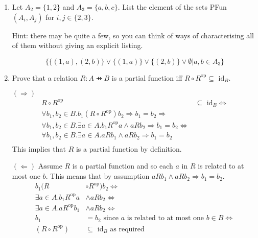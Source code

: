 \documentclass[10pt,\jkfside,a4paper]{article}
\begin{document}
\begin{enumerate}

\item Let $A_2 = \{1, 2\}$ and $A_3 = \{a, b, c\}$. List the element of the sets PFun$(A_i, A_j)$ for 
$i, j \in \{2, 3\}$.

Hint: there may be quite a few, so you can think of ways of characterising all of them without giving 
an explicit listing.

\begin{equation}
\{\{(1, a), (2, b)\} \vee \{(1, a)\} \vee \{(2, b)\} \vee \emptyset | a, b \in A_3\}
\end{equation}

\item Prove that a relation $R: A \pfun B$ is a partial function iff $R \circ R^{\text{op}} \subseteq \text{ id}_B$.

$(\Longrightarrow)$
\begin{equation}
\begin{split}
R \circ R^{\text{op}} &\subseteq \text{ id}_B \Longleftrightarrow \\
\forall b_1, b_2 \in B. b_1 (R \circ R^{\text{op}}) b_2 \Longrightarrow b_1 = b_2 \Longrightarrow \\
\forall b_1, b_2 \in B. \exists a \in A. b_1 R^{\text{op}} a \wedge a R b_2 \Longrightarrow b_1 = b_2 \Longleftrightarrow \\
\forall b_1, b_2 \in B. \exists a \in A. a R b_1 \wedge a R b_2 \Longrightarrow b_1 = b_2 \\
\end{split}
\end{equation}
This implies that $R$ is a partial function by definition.

$(\Longleftarrow)$
Assume $R$ is a partial function and so each $a$ in $R$ is related to at most one $b$.
This means that by assumption $a R b_1 \wedge a R b_2 \Longrightarrow b_1 = b_2$.
\begin{equation}
\begin{split}
b_1 (R &\circ R^{\text{op}}) b_2 \Longleftrightarrow \\
\exists a \in A. b_1 R^{\text{op}} a &\wedge a R b_2 \Longleftrightarrow \\
\exists a \in A. a R^{\text{op}} b_1 &\wedge a R b_2 \Longleftrightarrow \\
b_1 &= b_2 \text{ since $a$ is related to at most one $b \in B$}\Longleftrightarrow \\
(R \circ R^{\text{op}}) &\subseteq \text{ id}_B \text{ as required} \\
\end{split}
\end{equation}


\end{enumerate}
\end{document}
